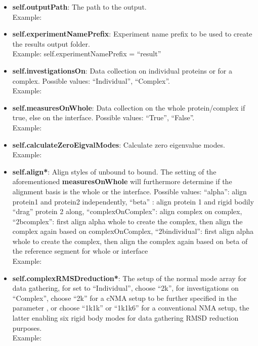\documentclass[11pt]{article}
\begin{document}
\begin{itemize}
\item \textbf{self.outputPath}: The path to the output. \\ 
Example: 

\item \textbf{self.experimentNamePrefix}: Experiment name prefix to be used to create the results output folder. \\
Example: self.experimentNamePrefix = ``result''

\item \textbf{self.investigationsOn}: Data collection on individual proteins or for a complex. Possible values: ``Individual'', ``Complex''. \\
Example: 

\item \textbf{self.measuresOnWhole}: Data collection on the whole protein/complex if true, else on the interface. Possible values: ``True'', ``False''. \\
Example: 

\item \textbf{self.calculateZeroEigvalModes}: Calculate zero eigenvalue modes. \\
Example: 

\item \textbf{self.align*}: Align styles of unbound to bound. The setting of the aforementioned \textbf{measuresOnWhole} will furthermore determine if the alignment basis is the whole or the interface. Possible values: ``alpha'': align protein1 and protein2 independently, ``beta'' : align protein 1 and rigid bodily ``drag'' protein 2 along, ``complexOnComplex'': align complex on complex, ``2bcomplex'': first align alpha whole to create the complex, then align the complex again based on complexOnComplex, ``2bindividual'': first align alpha whole to create the complex, then align the complex again based on beta of the reference segment for whole or interface \\
Example: 

\item \textbf{self.complexRMSDreduction*}: The setup of the normal mode array for data gathering, for \textbf{} set to ``Individual'', choose ``2k'', for investigations on ``Complex'', choose ``2k'' for a cNMA setup to be further specified in the parameter \textbf{}, or choose ``1k1k'' or ``1k1k6'' for a conventional NMA setup, the latter enabling six rigid body modes for data gathering RMSD reduction purposes. \\
Example: 


\end{itemize}
\end{document}

